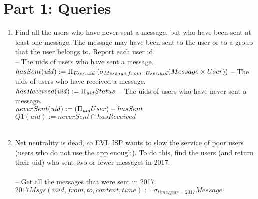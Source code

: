 \documentclass{article}
\newcommand{\var}[1]{\mathit{#1}}
\begin{document}
\section*{Part 1: Queries}

\begin{enumerate}

\item   %
Find all the users who have never sent a message, but who have been sent at least one message. The message may have been sent to the user or to a group that the user belongs to. Report each user id. \\

{\large %
\hspace*{1cm} --  The uids of users who have sent a message. \\ [5pt]
$
hasSent(\var{uid}) :=
	\Pi_{\var{User.uid}}\;	%
	(\sigma_{Message.from = User.uid} 
	(Message \times User)) \\\\[5pt]
$
\hspace*{1cm} -- The uids of users who have received a message. \\[5pt]
$
hasReceived(\var{uid}) := 
	\Pi_{\var{uid}} 
	Status 
	\\\\[5pt]
$
\hspace*{1cm} -- The uids of users who have never sent a message. \\[5pt]
$
neverSent(\var{uid}) := 
	(\Pi_{\var{uid}} User) - hasSent 
	\\\\[5pt]
$
$
Q1(\var{uid}) :=
	neverSent \cap hasReceived
$\\\\ %

} %


\item   %
Net neutrality is dead, so EVL ISP wants to slow the service of poor users (users who do not use the app enough). To do this, find the users (and return their uid) who sent two or fewer messages in 2017.\\\\
{\large
\hspace*{1cm} -- Get all the messages that were sent in 2017. \\ [5pt]
$
2017Msgs(\var{mid}, \var{from}, \var{to}, \var{content}, \var{time}) :=
	\sigma_{time.year = 2017} Message
$\\

}
\end{enumerate}
\end{document}
